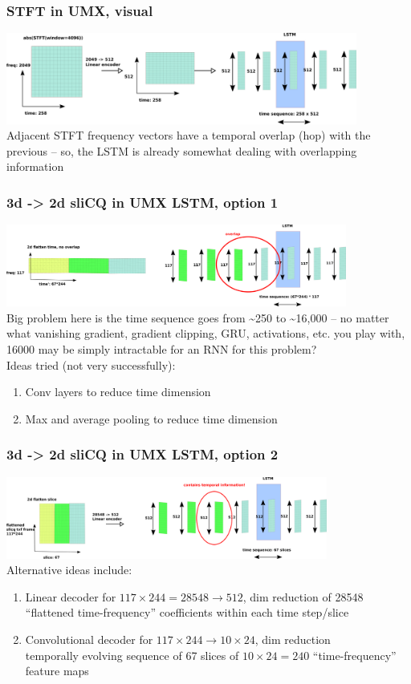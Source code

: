\documentclass[usenames,dvipsnames]{beamer}
\begin{document}
\begin{frame}
	\frametitle{STFT in UMX, visual}
	\includegraphics[height=3cm]{./umxstftlstm.png}\\
	Adjacent STFT frequency vectors have a temporal overlap (hop) with the previous -- so, the LSTM is already somewhat dealing with overlapping information
\end{frame}


\begin{frame}
	\frametitle{3d -> 2d sliCQ in UMX LSTM, option 1}
	\includegraphics[height=2.7cm]{./umxslicqlstm1.png}\\
	Big problem here is the time sequence goes from \textasciitilde 250 to \textasciitilde 16,000 -- no matter what vanishing gradient, gradient clipping, GRU, activations, etc. you play with, 16000 may be simply intractable for an RNN for this problem?\\
	Ideas tried (not very successfully):
	\begin{enumerate}
		\item
			Conv layers to reduce time dimension
		\item
			Max and average pooling to reduce time dimension
	\end{enumerate}
\end{frame}

\begin{frame}
	\frametitle{3d -> 2d sliCQ in UMX LSTM, option 2}
	\includegraphics[height=2.7cm]{./umxslicqlstm2.png}\\
	Alternative ideas include:
	\begin{enumerate}
		\item
			Linear decoder for $117 \times 244 = 28548 \rightarrow 512$, dim reduction of 28548 ``flattened time-frequency'' coefficients within each time step/slice
		\item
			Convolutional decoder for $117 \times 244 \rightarrow 10 \times 24$, dim reduction\\
			temporally evolving sequence of 67 slices of $10 \times 24 = 240$ ``time-frequency'' feature maps
	\end{enumerate}
\end{frame}
\end{document}

